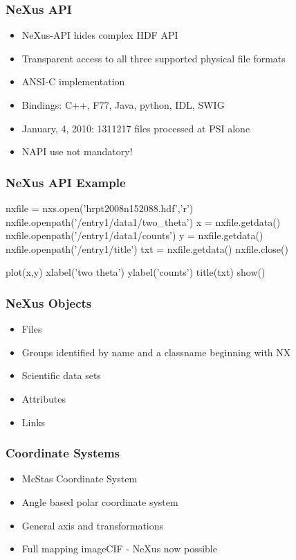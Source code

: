\documentclass{beamer}
\begin{document}
\begin{frame} \frametitle{NeXus API }
\begin{itemize}
\item NeXus-API hides complex HDF API
\item Transparent access to all three supported physical file formats
\item ANSI-C implementation
\item Bindings: C++, F77, Java, python, IDL, SWIG
\item January, 4, 2010: 1311217 files processed at PSI alone
\item NAPI use not mandatory!
\end{itemize}
\end{frame}

\begin{frame}[fragile]
 \frametitle{NeXus API Example }
\begin{semiverbatim}
nxfile = nxs.open('hrpt2008n152088.hdf','r')
nxfile.openpath('/entry1/data1/two\_theta')
x = nxfile.getdata()
nxfile.openpath('/entry1/data1/counts')
y = nxfile.getdata()
nxfile.openpath('/entry1/title')
txt = nxfile.getdata()
nxfile.close()

plot(x,y)
xlabel('two theta')
ylabel('counts')
title(txt)
show()
\end{semiverbatim}
\end{frame}



\begin{frame} \frametitle{NeXus Objects}
\begin{itemize}
\item Files
\item Groups identified by name and a classname beginning with NX
\item Scientific data sets
\item Attributes
\item Links
\end{itemize}
\end{frame}

\begin{frame} \frametitle{Coordinate Systems}
\begin{itemize}
\item McStas Coordinate System
\item Angle based polar coordinate system
\item General axis and transformations
\item Full mapping imageCIF - NeXus now possible
\end{itemize}
\end{frame}
\end{document}
